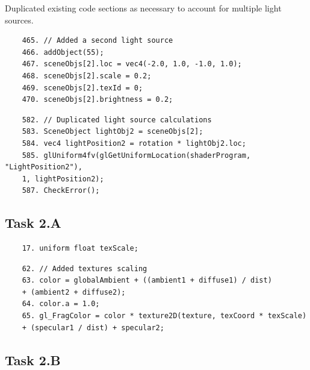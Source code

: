 \documentclass{article}
\begin{document}
\begin{info} %
	Duplicated existing code sections as necessary to account for multiple light sources.
\end{info}


\begin{commandline}
	\begin{verbatim}
	465. // Added a second light source
	466. addObject(55);
	467. sceneObjs[2].loc = vec4(-2.0, 1.0, -1.0, 1.0);
	468. sceneObjs[2].scale = 0.2;
	469. sceneObjs[2].texId = 0;
	470. sceneObjs[2].brightness = 0.2;
	\end{verbatim}
\end{commandline}

\begin{commandline}
	\begin{verbatim}
	582. // Duplicated light source calculations
	583. SceneObject lightObj2 = sceneObjs[2];
	584. vec4 lightPosition2 = rotation * lightObj2.loc;
	585. glUniform4fv(glGetUniformLocation(shaderProgram, "LightPosition2"),
	1, lightPosition2);
	587. CheckError();
	\end{verbatim}
\end{commandline}

\subsection{Task 2.A}\label{sec:2A}


\begin{commandlineF}
	\begin{verbatim}
	17. uniform float texScale;
	\end{verbatim}
\end{commandlineF}

\begin{commandlineF}
	\begin{verbatim}
	62. // Added textures scaling
	63. color = globalAmbient + ((ambient1 + diffuse1) / dist)
	+ (ambient2 + diffuse2);
	64. color.a = 1.0;
	65. gl_FragColor = color * texture2D(texture, texCoord * texScale)
	+ (specular1 / dist) + specular2;
	\end{verbatim}
\end{commandlineF}

\newpage
\subsection{Task 2.B}\label{sec:2B}
\end{document}
